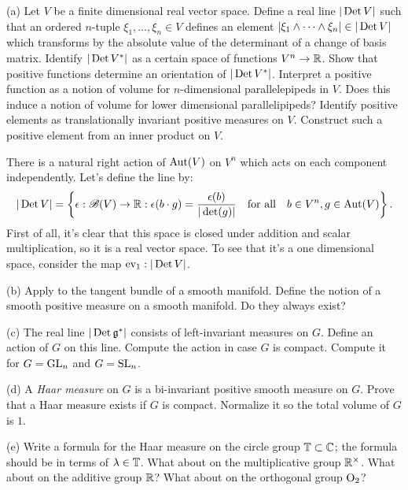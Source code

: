 \documentclass{../../templates/lkx_pset}
\begin{document}
\begin{parts}
	\begin{part}{(a)}
		Let $V$ be a finite dimensional real vector space. Define a real line $|\operatorname{Det} V|$ such that an ordered $n$-tuple $\xi_1,\ldots, \xi_n\in V$ defines an element $|\xi_1\wedge\cdots\wedge \xi_n|\in |\operatorname{Det} V|$ which transforms by the absolute value of the determinant of a change of basis matrix. Identify $|\operatorname{Det} V^*|$ as a certain space of functions $V^n \to \mathbb{R}$. Show that positive functions determine an orientation of $|\operatorname{Det} V^*|$. Interpret a positive function as a notion of volume for $n$-dimensional parallelepipeds in $V$. Does this induce a notion of volume for lower dimensional parallelipipeds? Identify positive elements as translationally invariant positive measures on $V$. Construct such a positive element from an inner product on $V$.
	\end{part}

	There is a natural right action of $\textrm{Aut}(V)$ on $V^n$ which acts on each component independently. Let's define the line by:
	\[
		|\operatorname{Det} V| = \left\{
		\epsilon : \mathscr{B}(V) \to \mathbb{R} : \epsilon(b\cdot g) = \frac{\epsilon(b)}{|\det(g)|} \quad\textrm{for all}\quad b\in V^n, g\in \textrm{Aut}(V)
		\right\}.
	\]
	First of all, it's clear that this space is closed under addition and scalar multiplication, so it is a real vector space. To see that it's a one dimensional space, consider the map $\textrm{ev}_1 : |\operatorname{Det} V|$.

	\begin{part}{(b)}
		Apply to the tangent bundle of a smooth manifold. Define the notion of a smooth positive measure on a smooth manifold. Do they always exist?
	\end{part}

	\begin{part}{(c)}
		The real line $|\operatorname{Det} \mathfrak{g}^*|$ consists of left-invariant measures on $G$. Define an action of $G$ on this line. Compute the action in case $G$ is compact. Compute it for $G = \operatorname{GL}_n$ and $G= \textrm{SL}_n$.
	\end{part}

	\begin{part}{(d)}
		A \emph{Haar measure} on $G$ is a bi-invariant positive smooth measure on $G$. Prove that a Haar measure exists if $G$ is compact. Normalize it so the total volume of $G$ is $1$.
	\end{part}

	\begin{part}{(e)}
		Write a formula for the Haar measure on the circle group $\mathbb{T}\subset \mathbb{C}$; the formula should be in terms of $\lambda\in \mathbb{T}$. What about on the multiplicative group $\mathbb{R}^\times$. What about on the additive group $\mathbb{R}$? What about on the orthogonal group $\operatorname{O}_2$?
	\end{part}
\end{parts}
\end{document}
